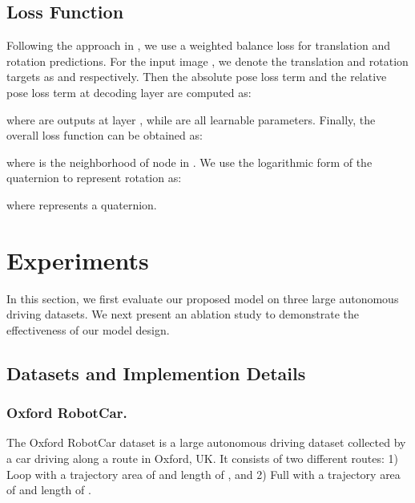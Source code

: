 \documentclass[letterpaper]{article} \usepackage{aaai23}  \usepackage{times}  \usepackage{helvet}  \usepackage{courier}  \usepackage[hyphens]{url}  \usepackage{graphicx} \urlstyle{rm} \def\UrlFont{\rm}  \usepackage{natbib}  \usepackage{caption} \frenchspacing  \setlength{\pdfpagewidth}{8.5in} \setlength{\pdfpageheight}{11in} \usepackage{booktabs}
\theoremstyle{remark}
\theoremstyle{plain}
\begin{document}
\subsection{Loss Function}
Following the approach in \cite{atloc}, we use a weighted balance loss for translation and rotation predictions. For the input image , we denote the translation and rotation targets as  and  respectively. Then the absolute pose loss term  and the relative pose loss term  at decoding layer  are computed as: 

where  are outputs at layer , while  are all learnable parameters. Finally, the overall loss function can be obtained as:

where  is the neighborhood of node  in . We use the logarithmic form of the quaternion to represent rotation  as:

where  represents a quaternion.


























\section{Experiments}
In this section, we first evaluate our proposed model on three large autonomous driving datasets. We next present an ablation study to demonstrate the effectiveness of our model design.







\subsection{Datasets and Implemention Details}
\subsubsection{Oxford RobotCar.}
The Oxford RobotCar dataset\cite{robotcar} is a large autonomous driving dataset collected by a car driving along a route in Oxford, UK. It consists of two different routes: 1) Loop with a trajectory area of  and length of ,  and 2) Full with a trajectory area of  and length of .
\end{document}
